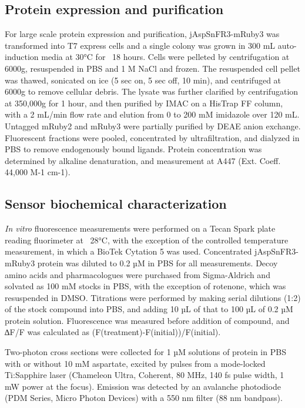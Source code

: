 \documentclass[9pt,lineno]{elife}
\begin{document}
\subsection{Protein expression and purification}
For large scale protein expression and purification, jAspSnFR3-mRuby3 was transformed into T7 express cells and a single colony was grown in 300 mL auto-induction media \citep{Studier2005-ki} at 30°C for ~18 hours.
Cells were pelleted by centrifugation at 6000g, resuspended in PBS and 1 M NaCl and frozen.
The resuspended cell pellet was thawed, sonicated on ice (5 sec on, 5 sec off, 10 min), and centrifuged at 6000g to remove cellular debris.
The lysate was further clarified by centrifugation at 350,000g for 1 hour, and then purified by IMAC on a HisTrap FF column, with a 2 mL/min flow rate and elution from 0 to 200 mM imidazole over 120 mL.
Untagged mRuby2 and mRuby3 were partially purified by DEAE anion exchange.
Fluorescent fractions were pooled, concentrated by ultrafiltration, and dialyzed in PBS to remove endogenously bound ligands.
Protein concentration was determined by alkaline denaturation, and measurement at A447 (Ext. Coeff. 44,000 M-1 cm-1).

\subsection{Sensor biochemical characterization}
\textit{In vitro} fluorescence measurements were performed on a Tecan Spark plate reading fluorimeter at ~28°C, with the exception of the controlled temperature measurement, in which a BioTek Cytation 5 was used.
Concentrated jAspSnFR3-mRuby3 protein was diluted to 0.2 µM in PBS for all measurements.
Decoy amino acids and pharmacologues were purchased from Sigma-Aldrich and solvated as 100 mM stocks in PBS, with the exception of rotenone, which was resuspended in DMSO.
Titrations were performed by making serial dilutions (1:2) of the stock compound into PBS, and adding 10 µL of that to 100 µL of 0.2 µM protein solution.
Fluorescence was measured before addition of compound, and ∆F/F was calculated as (F(treatment)-F(initial))/F(initial).

Two-photon cross sections were collected for 1 µM solutions of protein in PBS with or without 10 mM aspartate, excited by pulses from a mode-locked Ti:Sapphire laser (Chameleon Ultra, Coherent, 80 MHz, 140 fs pulse width, 1 mW power at the focus).
Emission was detected by an avalanche photodiode (PDM Series, Micro Photon Devices) with a 550 nm filter (88 nm bandpass).
\end{document}
